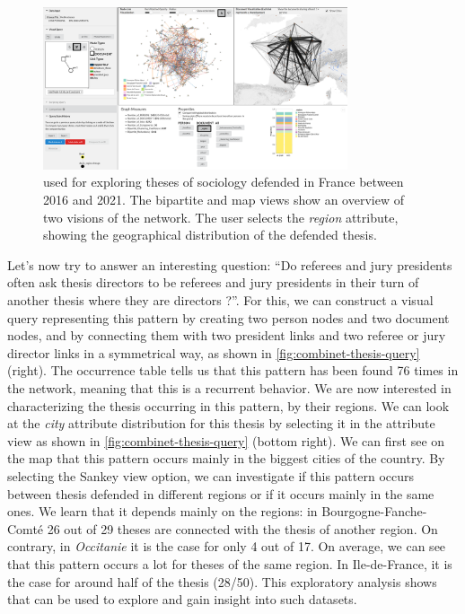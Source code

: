 \begin{figure}[!h]
    \centering
    \includegraphics[width=0.8\textwidth]{static/figures/ComBiNet/Thesis-first-exploration}
    \caption{\name used for exploring theses of sociology defended in France between 2016 and 2021. The bipartite and map views show an overview of two visions of the network. The user selects the \textit{region} attribute, showing the geographical distribution of the defended thesis.}\label{fig:combinet-thesis-exploration}
\end{figure}

Let's now try to answer an interesting question: ``Do referees and jury presidents often ask thesis directors to be referees and jury presidents in their turn of another thesis where they are directors ?''.
For this, we can construct a visual query representing this pattern by creating two person nodes and two document nodes, and by connecting them with two president links and two referee or jury director links in a symmetrical way, as shown in \autoref{fig:combinet-thesis-query} (right).
The occurrence table tells us that this pattern has been found 76 times in the network, meaning that this is a recurrent behavior.
We are now interested in characterizing the thesis occurring in this pattern, by their regions.
We can look at the \textit{city} attribute distribution for this thesis by selecting it in the attribute view as shown in \autoref{fig:combinet-thesis-query} (bottom right).
We can first see on the map that this pattern occurs mainly in the biggest cities of the country.
By selecting the Sankey view option, we can investigate if this pattern occurs between thesis defended in different regions or if it occurs mainly in the same ones.
We learn that it depends mainly on the regions: in Bourgogne-Fanche-Comté 26 out of 29 theses are connected with the thesis of another region.
On contrary, in \textit{Occitanie} it is the case for only 4 out of 17.
On average, we can see that this pattern occurs a lot for theses of the same region.
In Ile-de-France, it is the case for around half of the thesis (28/50).
This exploratory analysis shows that \name can be used to explore and gain insight into such datasets.







